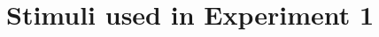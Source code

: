 \documentclass[10pt,letterpaper]{article}
\begin{document}
%	
%	
%	
%	



\appendix
\section{Stimuli used in Experiment 1}
\label{sec:appendix}
\end{document}
